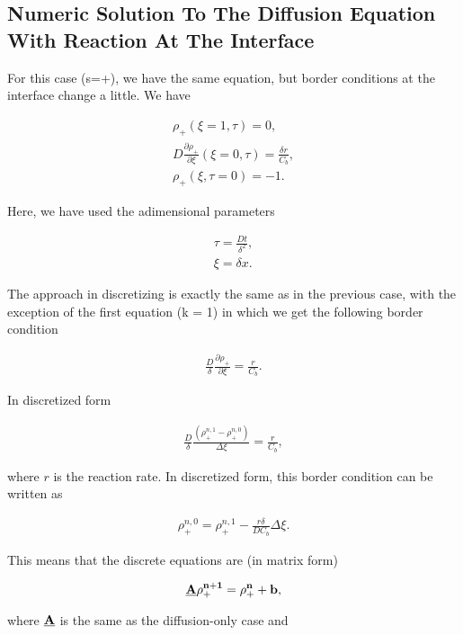 \subsection{Numeric Solution To The Diffusion Equation With Reaction At The Interface}


For this case (s=+), we have the same equation, but border conditions at the interface change a little. We have

\begin{align}
	\rho_+(\xi = 1, \tau) = 0, \\
	D \frac{\partial \rho_+}{\partial \xi} (\xi = 0, \tau) = \frac{\delta r}{C_b},\\
	\rho_+(\xi, \tau = 0) = -1.
\end{align}

Here, we have used the adimensional parameters 

\begin{align}
    \tau = \frac{D t }{\delta ^2},\\
    \xi = \delta x.
\end{align}


The approach in discretizing is exactly the same as in the previous case, with the exception of the first equation (k = 1) in which we get the following border condition

\begin{align}
    \frac{D}{\delta}\frac{\partial \rho_+}{\partial \xi} = \frac{r}{C_b}.
\end{align}

In discretized form

\begin{align}
    \frac{D}{\delta}\frac{(\rho_+^{n,1}-\rho_+^{n,0})}{\Delta \xi} = \frac{r}{C_b},
\end{align}

where $r$ is the reaction rate. In discretized form, this border condition can be written as

\begin{align}
    \rho_+^{n,0} = \rho_+^{n,1} - \frac{r\delta }{D C_b}\Delta \xi.
\end{align}


This means that the discrete equations are (in matrix form)

\begin{align}
    \bf{\underline{A}} \bf{\rho_+^{n+1}}  = \bf{\rho_+^n} + \bf{b},
\end{align}

where $\bf{\underline{A}}$ is the same as the diffusion-only case and 


